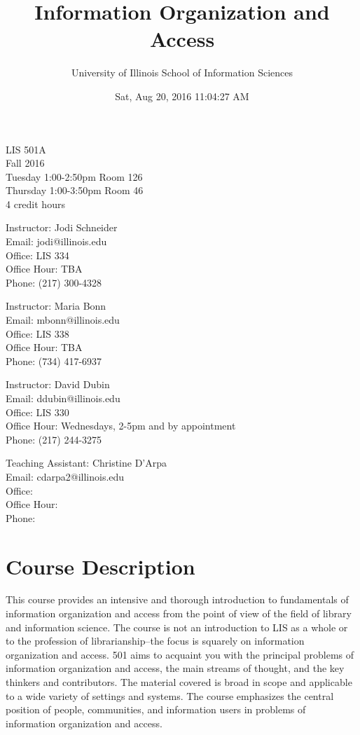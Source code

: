\documentclass[]{article}
\title{Information Organization and Access}
\author{University of Illinois School of Information Sciences}
\date{Sat, Aug 20, 2016 11:04:27 AM}
\begin{document}
\maketitle

LIS 501A\\
Fall 2016\\
Tuesday 1:00-2:50pm Room 126\\
Thursday 1:00-3:50pm Room 46\\
4 credit hours

Instructor: Jodi Schneider\\
Email: jodi@illinois.edu\\
Office: LIS 334\\
Office Hour: TBA\\
Phone: (217) 300-4328

Instructor: Maria Bonn\\
Email: mbonn@illinois.edu\\
Office: LIS 338\\
Office Hour: TBA\\
Phone: (734) 417-6937

Instructor: David Dubin\\
Email: ddubin@illinois.edu\\
Office: LIS 330\\
Office Hour: Wednesdays, 2-5pm and by appointment\\
Phone: (217) 244-3275

Teaching Assistant: Christine D'Arpa\\
Email: cdarpa2@illinois.edu\\
Office:\\
Office Hour:\\
Phone:

\section{Course Description}\label{course-description}

This course provides an intensive and thorough introduction to
fundamentals of information organization and access from the point of
view of the field of library and information science. The course is not
an introduction to LIS as a whole or to the profession of
librarianship--the focus is squarely on information organization and
access. 501 aims to acquaint you with the principal problems of
information organization and access, the main streams of thought, and
the key thinkers and contributors. The material covered is broad in
scope and applicable to a wide variety of settings and systems. The
course emphasizes the central position of people, communities, and
information users in problems of information organization and access.
\end{document}
